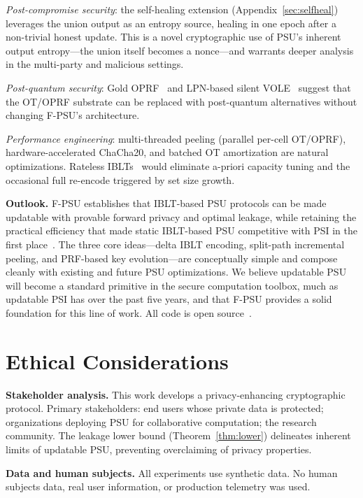 \documentclass[letterpaper,twocolumn,10pt]{article}
\theoremstyle{definition}
\begin{document}
\emph{Post-compromise security}: the self-healing extension
(Appendix~\ref{sec:selfheal}) leverages the union output as an entropy source,
healing in one epoch after a non-trivial honest update. This is a novel
cryptographic use of PSU's inherent output entropy---the union itself becomes
a nonce---and warrants deeper analysis in the multi-party and malicious
settings.

\emph{Post-quantum security}: Gold OPRF~\cite{YBH+25} and LPN-based silent
VOLE~\cite{RRT23} suggest that the OT/OPRF substrate can be replaced with
post-quantum alternatives without changing F-PSU's architecture.

\emph{Performance engineering}: multi-threaded peeling (parallel per-cell
OT/OPRF), hardware-accelerated ChaCha20, and batched OT amortization are
natural optimizations. Rateless IBLTs~\cite{YGA24} would eliminate a-priori
capacity tuning and the occasional full re-encode triggered by set size
growth.

\smallskip\noindent\textbf{Outlook.}
F-PSU establishes that IBLT-based PSU protocols can be made updatable with
provable forward privacy and optimal leakage, while retaining the practical
efficiency that made static IBLT-based PSU competitive with PSI
in the first place~\cite{PT26}. The three core ideas---delta IBLT encoding,
split-path incremental peeling, and PRF-based key evolution---are
conceptually simple and compose cleanly with existing and future PSU
optimizations. We believe updatable PSU will become a standard primitive in
the secure computation toolbox, much as updatable PSI has over the past
five years, and that F-PSU provides a solid foundation for this line of
work. All code is open source~\cite{code}.

\section{Ethical Considerations}

\textbf{Stakeholder analysis.} This work develops a privacy-enhancing
cryptographic protocol. Primary stakeholders: end users whose private data is
protected; organizations deploying PSU for collaborative computation; the
research community. The leakage lower bound (Theorem~\ref{thm:lower})
delineates inherent limits of updatable PSU, preventing overclaiming of
privacy properties.

\textbf{Data and human subjects.} All experiments use synthetic data. No human
subjects data, real user information, or production telemetry was used.
\end{document}
